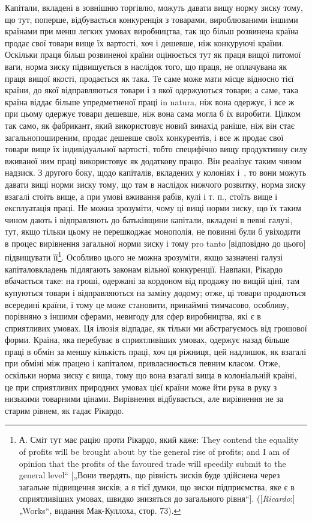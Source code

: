 Капітали, вкладені в зовнішню торгівлю, можуть давати вищу норму зиску тому, що тут, поперше,
відбувається конкуренція з товарами, вироблюваними іншими країнами при менш легких умовах
виробництва, так що більш розвинена країна продає свої
товари вище їх вартості, хоч і дешевше, ніж конкуруючі країни. Оскільки праця більш розвиненої
країни оцінюється тут як праця вищої питомої ваги, норма зиску підвищується в наслідок того, що
праця, не оплачувана як праця вищої якості, продається як така. Те саме може мати місце відносно
тієї країни, до якої відправляються товари і з якої одержуються товари; а саме, така країна віддає
більше упредметненої праці in natura, ніж вона одержує, і все ж при цьому одержує товари дешевше,
ніж вона сама могла б їх виробити. Цілком так само, як фабрикант,
який використовує новий винахід раніше, ніж він стає загальнопоширеним, продає дешевше своїх
конкурентів, і все ж продає свої товари вище їх індивідуальної вартості, тобто специфічно вищу
продуктивну силу вживаної ним праці використовує як додаткову працю. Він реалізує таким чином
надзиск. З другого боку, щодо капіталів, вкладених у колоніях і~, то вони можуть давати вищі
норми зиску тому, що там в наслідок нижчого розвитку, норма зиску взагалі стоїть вище, а при умові
вживання рабів, кулі і т. п., стоїть вище і експлуатація праці. Не можна зрозуміти, чому ці вищі
норми зиску, що їх таким чином дають і відправляють до батьківщини капітали, вкладені в певні
галузі, тут, якщо тільки цьому не перешкоджає монополія, не повинні були б увіходити в процес
вирівнення загальної норми зиску і тому pro tanto [відповідно до цього] підвищувати її\footnote{
А. Сміт тут має рацію проти Рікардо, який каже: They contend the equality of profits will be
brought about by the general rise of profits; and I am of opinion that the profits of the favoured
trade will speedily submit to the general level“ [„Вони твердять, що рівність зисків буде здійснена
через загальне підвищення зисків; а я тієї думки, що зиски підприємства, яке є в сприятливіших
умовах, швидко знизяться до загального рівня“]. ([\emph{Ricardo}:] „Works“, видання Мак-Куллоха, стор. 73).
}. Особливо
цього не можна зрозуміти, якщо зазначені
галузі капіталовкладень підлягають законам вільної конкуренції. Навпаки, Рікардо вбачається
таке: на гроші, одержані за кордоном від продажу по вищій ціні, там купуються товари і
відправляються на заміну додому; отже, ці товари продаються
всередині країни, і тому це може становити, принаймні тимчасово, особливу, порівняно з іншими
сферами, невигоду для сфер виробництва, які є в сприятливих умовах. Ця ілюзія відпадає, як тільки ми
абстрагуємось від грошової форми. Країна,
яка перебуває в сприятливіших умовах, одержує назад більше праці в обмін за меншу кількість праці,
хоч ця ріжниця, цей надлишок, як взагалі при обміні між працею і капіталом, привласнюється певним
класом. Отже, оскільки норма зиску є вища, тому
що вона взагалі вища в колоніальній країні, це при сприятливих природних умовах цієї країни може йти
рука в руку з низькими товарними цінами. Вирівнення відбувається, але вирівнення не за старим
рівнем, як гадає Рікардо.

